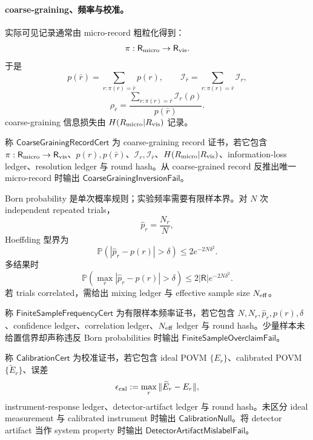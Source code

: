 \paragraph{coarse-graining、频率与校准。}
实际可见记录通常由 micro-record 粗粒化得到：
\[
\pi:\mathsf R_{\rm micro}\to\mathsf R_{\rm vis}.
\]
于是
\[
\boxed{
p(\bar r)
=
\sum_{r:\pi(r)=\bar r}p(r),
\qquad
\mathcal I_{\bar r}
=
\sum_{r:\pi(r)=\bar r}\mathcal I_r,
}
\]
\[
\boxed{
\rho_{\bar r}
=
\frac{\sum_{r:\pi(r)=\bar r}\mathcal I_r(\rho)}{p(\bar r)}.
}
\]
coarse-graining 信息损失由 \(H(R_{\rm micro}|R_{\rm vis})\) 记录。

\begin{definition}\label{def:typed-address-biaxial-completion-coarse-graining-record-cert}
称 \(\mathsf{CoarseGrainingRecordCert}\) 为 coarse-graining record 证书，若它包含 \(\pi:\mathsf R_{\rm micro}\to\mathsf R_{\rm vis}\)、\(p(r),p(\bar r)\)、\(\mathcal I_r,\mathcal I_{\bar r}\)、\(H(R_{\rm micro}|R_{\rm vis})\)、information-loss ledger、resolution ledger 与 round hash。从 coarse-grained record 反推出唯一 micro-record 时输出 \(\mathsf{CoarseGrainingInversionFail}\)。
\end{definition}

Born probability 是单次概率规则；实验频率需要有限样本界。对 \(N\) 次 independent repeated trials，
\[
\hat p_r=\frac{N_r}{N},
\]
Hoeffding 型界为
\[
\mathbb P(|\hat p_r-p(r)|>\delta)
\le
2e^{-2N\delta^2}.
\]
多结果时
\[
\mathbb P\!\left(\max_r|\hat p_r-p(r)|>\delta\right)
\le
2|\mathsf R|e^{-2N\delta^2}.
\]
若 trials correlated，需给出 mixing ledger 与 effective sample size \(N_{\rm eff}\)。

\begin{definition}[有限样本频率证书]\label{def:typed-address-biaxial-completion-finite-sample-frequency-cert}
称 \(\mathsf{FiniteSampleFrequencyCert}\) 为有限样本频率证书，若它包含 \(N,N_r,\hat p_r,p(r),\delta\)、confidence ledger、correlation ledger、\(N_{\rm eff}\) ledger 与 round hash。少量样本未给置信界却声称违反 Born probabilities 时输出 \(\mathsf{FiniteSampleOverclaimFail}\)。
\end{definition}

\begin{definition}[校准证书]\label{def:typed-address-biaxial-completion-calibration-cert}
称 \(\mathsf{CalibrationCert}\) 为校准证书，若它包含 ideal POVM \(\{E_r\}\)、calibrated POVM \(\{\widetilde E_r\}\)、误差
\[
\epsilon_{\rm cal}:=\max_r\|\widetilde E_r-E_r\|,
\]
instrument-response ledger、detector-artifact ledger 与 round hash。未区分 ideal measurement 与 calibrated instrument 时输出 \(\mathsf{CalibrationNull}\)。将 detector artifact 当作 system property 时输出 \(\mathsf{DetectorArtifactMislabelFail}\)。
\end{definition}

